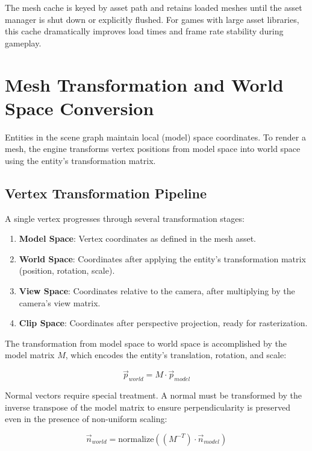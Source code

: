 The mesh cache is keyed by asset path and retains loaded meshes until the asset manager is shut down or explicitly flushed. For games with large asset libraries, this cache dramatically improves load times and frame rate stability during gameplay.

\section{Mesh Transformation and World Space Conversion}

Entities in the scene graph maintain local (model) space coordinates. To render a mesh, the engine transforms vertex positions from model space into world space using the entity's transformation matrix.

\subsection{Vertex Transformation Pipeline}

A single vertex progresses through several transformation stages:

\begin{enumerate}
    \item \textbf{Model Space}: Vertex coordinates as defined in the mesh asset.
    \item \textbf{World Space}: Coordinates after applying the entity's transformation matrix (position, rotation, scale).
    \item \textbf{View Space}: Coordinates relative to the camera, after multiplying by the camera's view matrix.
    \item \textbf{Clip Space}: Coordinates after perspective projection, ready for rasterization.
\end{enumerate}

The transformation from model space to world space is accomplished by the model matrix $M$, which encodes the entity's translation, rotation, and scale:

\begin{equation}
    \vec{p}_{world} = M \cdot \vec{p}_{model}
\end{equation}

Normal vectors require special treatment. A normal must be transformed by the inverse transpose of the model matrix to ensure perpendicularity is preserved even in the presence of non-uniform scaling:

\begin{equation}
    \vec{n}_{world} = \text{normalize}((M^{-T}) \cdot \vec{n}_{model})
\end{equation}


